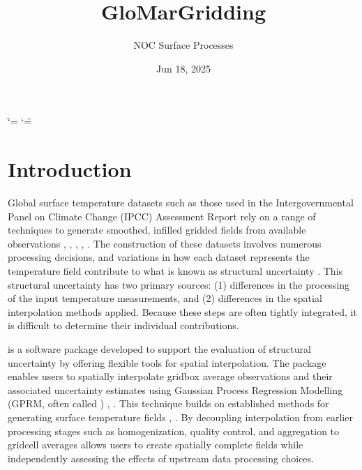\documentclass[letterpaper,10pt,english]{sphinxmanual}
\title{GloMarGridding}
\date{Jun 18, 2025}
\author{NOC Surface Processes}
\begin{document}
\ifdefined\shorthandoff
  \ifnum\catcode`\=\string=\active\shorthandoff{=}\fi
  \ifnum\catcode`\"=\active{}\fi
\fi

\pagestyle{empty}
\sphinxmaketitle
\pagestyle{plain}
\sphinxtableofcontents
\pagestyle{normal}
\label{\detokenize{index::doc}}


\sphinxstepscope


\chapter{Introduction}
\label{\detokenize{introduction:introduction}}\label{\detokenize{introduction::doc}}
\sphinxAtStartPar
Global surface temperature datasets \sphinxhyphen{} such as those used in the Intergovernmental Panel on Climate
Change (IPCC) Assessment Report  rely on a range of techniques to generate smoothed, infilled
gridded fields from available observations , , , ,
 . The construction of these datasets involves numerous processing decisions, and variations
in how each dataset represents the temperature field contribute to what is known as structural
uncertainty . This structural uncertainty has two primary sources: (1) differences in the
processing of the input temperature measurements, and (2) differences in the spatial interpolation
methods applied. Because these steps are often tightly integrated, it is difficult to determine
their individual contributions.

\sphinxAtStartPar
{} is a software package developed to support the evaluation of structural
uncertainty by offering flexible tools for spatial interpolation. The package enables users to
spatially interpolate grid\sphinxhyphen{}box average observations and their associated uncertainty estimates using
Gaussian Process Regression Modelling (GPRM, often called ) ,  . This
technique builds on established methods for generating surface temperature fields ,
. By decoupling interpolation from earlier processing stages \sphinxhyphen{} such as homogenization,
quality control, and aggregation to grid\sphinxhyphen{}cell averages \sphinxhyphen{}  allows users to create
spatially complete fields while independently assessing the effects of upstream data processing
choices.
\end{document}
